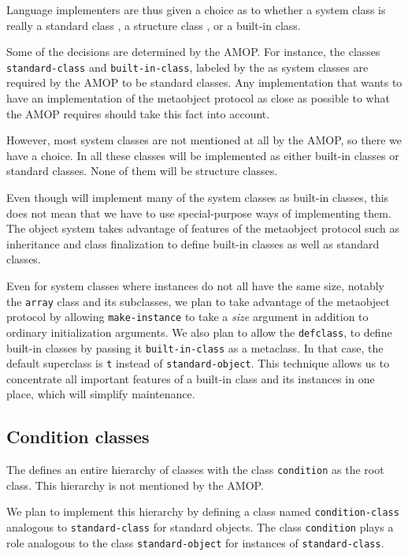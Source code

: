 Language implementers are thus given a choice as to whether a system
class is really a standard class
, a structure class 
, or a built-in class.

Some of the decisions are determined by the AMOP.  For instance, the
classes \texttt{standard-class} and \texttt{built-in-class}, labeled
by the \hs{} as system classes are required by the AMOP to be
standard classes.  Any implementation that wants to have an
implementation of the metaobject protocol as close as possible to what
the AMOP requires should take this fact into account. 

However, most system classes are not mentioned at all by the AMOP, so
there we have a choice.  In \sysname{} all these classes will be
implemented as either built-in classes or standard classes.  None of
them will be structure classes. 

Even though \sysname{} will implement many of the system classes as
built-in classes, this does not mean that we have to use
special-purpose ways of implementing them.  The \sysname{} object
system takes advantage of features of the metaobject protocol such as
inheritance and class finalization to define built-in classes as well
as standard classes.

Even for system classes where instances do not all have the same size,
notably the \texttt{array} class and its subclasses, we plan to take
advantage of the metaobject protocol by allowing
\texttt{make-instance} to take a \emph{size} argument in addition to
ordinary initialization arguments.  We also plan to allow the
\texttt{defclass}, to define built-in classes by passing it
\texttt{built-in-class} as a metaclass.  In that case, the default
superclass is \texttt{t} instead of \texttt{standard-object}.  This
technique allows us to concentrate all important features of a
built-in class and its instances in one place, which will simplify
maintenance.

\subsection{Condition classes}
\label{object-system-condition-classes}

The \hs{} defines an entire hierarchy of classes with the class
\texttt{condition} as the root class.  This hierarchy is not mentioned
by the AMOP.  

We plan to implement this hierarchy by defining a class named
\texttt{condition-class} analogous to \texttt{standard-class} for
standard objects.  The class \texttt{condition} plays a role analogous
to the class \texttt{standard-object} for instances of
\texttt{standard-class}. 

